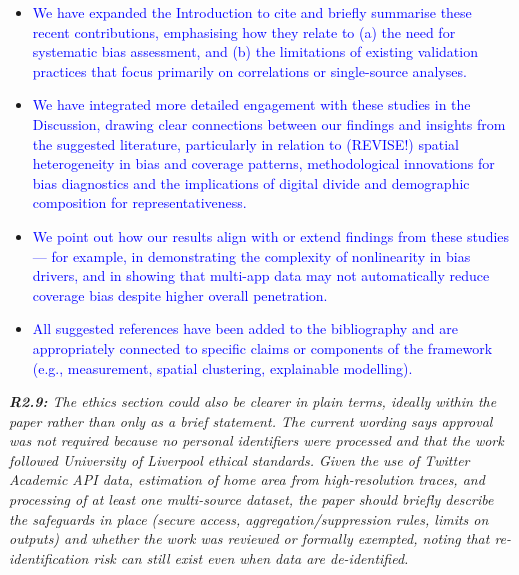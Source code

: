 \documentclass[
  letterpaper,
  DIV=11,
  numbers=noendperiod]{scrartcl}
\begin{document}
\vspace{-3mm} \begin{itemize}[noitemsep, topsep=0pt]
\item \textcolor{blue}{ We have expanded the Introduction to cite and briefly summarise these recent contributions, emphasising how they relate to (a) the need for systematic bias assessment, and (b) the limitations of existing validation practices that focus primarily on correlations or single-source analyses.}
\item \textcolor{blue}{ We have integrated more detailed engagement with these studies in the Discussion, drawing clear connections between our findings and insights from the suggested literature, particularly in relation to (REVISE!) spatial heterogeneity in bias and coverage patterns, methodological innovations for bias diagnostics and the implications of digital divide and demographic composition for representativeness.}
\item \textcolor{blue}{ We point out how our results align with or extend findings from these studies — for example, in demonstrating the complexity of nonlinearity in bias drivers, and in showing that multi-app data may not automatically reduce coverage bias despite higher overall penetration.}
\item \textcolor{blue}{ All suggested references have been added to the bibliography and are appropriately connected to specific claims or components of the framework (e.g., measurement, spatial clustering, explainable modelling).}
\end{itemize}

\setlength{\leftskip}{0cm}\textit{\textbf{R2.9:} The ethics section could also be clearer in plain terms, ideally within the paper rather than only as a brief statement. The current wording says approval was not required because no personal identifiers were processed and that the work followed University of Liverpool ethical standards. Given the use of Twitter Academic API data, estimation of home area from high-resolution traces, and processing of at least one multi-source dataset, the paper should briefly describe the safeguards in place (secure access, aggregation/suppression rules, limits on outputs) and whether the work was reviewed or formally exempted, noting that re-identification risk can still exist even when data are de-identified.}
\end{document}
